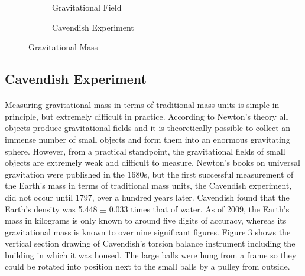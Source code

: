 \documentclass{book}
\begin{document}
    \begin{figure}[h]
        \centering
        \begin{subfigure}[b]{0.45\textwidth}
            \centering
            \caption{Gravitational Field}
            \label{fig:universal_gm}
        \end{subfigure}
        \hfill
        \begin{subfigure}[b]{0.45\textwidth}
            \centering
            \caption{Cavendish Experiment}
            \label{fig:cavendish}
        \end{subfigure}
        \caption{Gravitational Mass}
    \end{figure}

	\vspace{-15pt}
    \subsection{Cavendish Experiment}
    \paragraph{}
    Measuring gravitational mass in terms of traditional mass units is simple in principle, but extremely difficult in practice. According to Newton's theory all objects produce gravitational fields and it is theoretically possible to collect an immense number of small objects and form them into an enormous gravitating sphere. However, from a practical standpoint, the gravitational fields of small objects are extremely weak and difficult to measure. Newton's books on universal gravitation were published in the 1680s, but the first successful measurement of the Earth's mass in terms of traditional mass units, the Cavendish experiment, did not occur until 1797, over a hundred years later. Cavendish found that the Earth's density was 5.448 $\pm$ 0.033 times that of water. As of 2009, the Earth's mass in kilograms is only known to around five digits of accuracy, whereas its gravitational mass is known to over nine significant figures.  Figure \ref{fig:cavendish} shows the vertical section drawing of Cavendish's torsion balance instrument including the building in which it was housed. The large balls were hung from a frame so they could be rotated into position next to the small balls by a pulley from outside.
    
\end{document}
